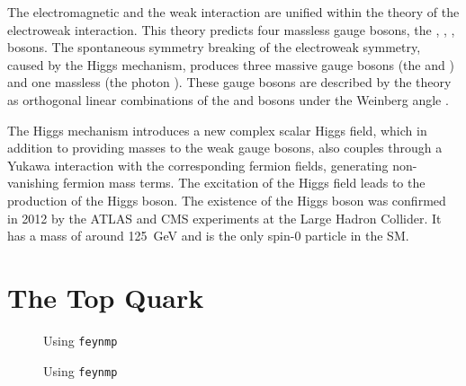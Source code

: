 The electromagnetic and the weak interaction are unified within the theory of the electroweak interaction. This theory predicts four massless gauge bosons, the \PBzero, \PWzero, \PWone, \PWtwo bosons. The spontaneous symmetry breaking of the electroweak symmetry, caused by the Higgs mechanism, produces three massive gauge bosons (the \PZz and \PWpm) and one massless (the photon \Pphoton). These gauge bosons are described by the theory as orthogonal linear combinations of the \PBzero and \PWzero bosons under the Weinberg angle \cite{wiki:electroweak}.

The Higgs mechanism introduces a new complex scalar Higgs field, which in addition to providing masses to the weak gauge bosons, also couples through a Yukawa interaction with the corresponding fermion fields, generating non-vanishing fermion mass terms. The excitation of the Higgs field leads to the production of the Higgs boson. The existence of the Higgs boson was confirmed in 2012 by the ATLAS and CMS experiments at the Large Hadron Collider. It has a mass of around \SI{125}{\giga\eV} \cite{Cha12} and is the only spin-0 particle in the SM.

\section{The Top Quark}
\label{sec:theory_top}

\begin{figure}[H]
    \centering
    \begin{subfigure}[b]{0.3\textwidth}
        \centering
        
    \end{subfigure}
    \hfill
    \begin{subfigure}[b]{0.3\textwidth}
        \centering
        
    \end{subfigure}
    \hfill
    \begin{subfigure}[b]{0.3\textwidth}
        \centering
        
    \end{subfigure}
    \caption{Using \texttt{feynmp}}
\end{figure}

\begin{figure}[H]
    \centering
    \begin{subfigure}[b]{0.3\textwidth}
        \centering
        
    \end{subfigure}
    \hfill
    \begin{subfigure}[b]{0.3\textwidth}
        \centering
        
    \end{subfigure}
    \hfill
    \begin{subfigure}[b]{0.3\textwidth}
        \centering
        
    \end{subfigure}
    \caption{Using \texttt{feynmp}}
\end{figure}
